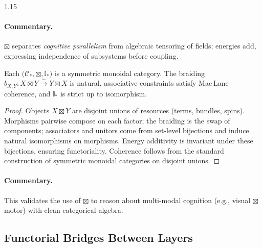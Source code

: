 \documentclass[12pt,a4paper]{article}
\begin{document}
\begin{spacing}{1.15}
\paragraph{Commentary.}
$\boxtimes$ separates \emph{cognitive parallelism} from algebraic tensoring of fields; energies add, expressing independence of subsystems before coupling.

\begin{proposition}
Each $\big(\mathcal{C}_{*},\boxtimes,\mathbb{I}_{*}\big)$ is a symmetric monoidal category. The braiding $b_{X,Y}\colon X\boxtimes Y \xrightarrow{\sim} Y\boxtimes X$ is natural, associative constraints satisfy Mac Lane coherence, and $\mathbb{I}_{*}$ is strict up to isomorphism.
\end{proposition}

\begin{proof}
Objects $X\boxtimes Y$ are disjoint unions of resources (terms, bundles, spins). Morphisms pairwise compose on each factor; the braiding is the swap of components; associators and unitors come from set-level bijections and induce natural isomorphisms on morphisms. Energy additivity is invariant under these bijections, ensuring functoriality. Coherence follows from the standard construction of symmetric monoidal categories on disjoint unions.
\end{proof}

\paragraph{Commentary.}
This validates the use of $\boxtimes$ to reason about multi-modal cognition (e.g., visual $\boxtimes$ motor) with clean categorical algebra.

\subsection{Functorial Bridges Between Layers}


\end{spacing}
\end{document}
